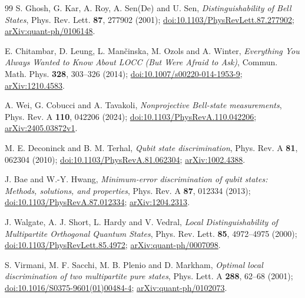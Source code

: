 \documentclass[11pt,a4paper]{article}
\theoremstyle{definition}
\theoremstyle{plain}
\begin{document}
\clearpage
\begingroup\small
\begin{thebibliography}{99}
\setlength{\itemsep}{2pt}
S. Ghosh, G. Kar, A. Roy, A. Sen(De) and U. Sen,
\emph{Distinguishability of Bell States},
Phys. Rev. Lett. \textbf{87}, 277902 (2001);
\href{https://doi.org/10.1103/PhysRevLett.87.277902}{doi:10.1103/PhysRevLett.87.277902};
\href{https://arxiv.org/abs/quant-ph/0106148}{arXiv:quant-ph/0106148}.

E. Chitambar, D. Leung, L. Man\v{c}inska, M. Ozols and A. Winter,
\emph{Everything You Always Wanted to Know About LOCC (But Were Afraid to Ask)},
Commun. Math. Phys. \textbf{328}, 303--326 (2014);
\href{https://doi.org/10.1007/s00220-014-1953-9}{doi:10.1007/s00220-014-1953-9};
\href{https://arxiv.org/abs/1210.4583}{arXiv:1210.4583}.

A. Wei, G. Cobucci and A. Tavakoli,
\emph{Nonprojective Bell-state measurements},
Phys. Rev. A \textbf{110}, 042206 (2024);
\href{https://doi.org/10.1103/PhysRevA.110.042206}{doi:10.1103/PhysRevA.110.042206};
\href{https://arxiv.org/abs/2405.03872v1}{arXiv:2405.03872v1}.

M. E. Deconinck and B. M. Terhal, \emph{Qubit state discrimination},
Phys. Rev. A \textbf{81}, 062304 (2010);
\href{https://doi.org/10.1103/PhysRevA.81.062304}{doi:10.1103/PhysRevA.81.062304};
\href{https://arxiv.org/abs/1002.4388}{arXiv:1002.4388}.

J. Bae and W.-Y. Hwang,
\emph{Minimum-error discrimination of qubit states: Methods, solutions, and properties},
Phys. Rev. A \textbf{87}, 012334 (2013);
\href{https://doi.org/10.1103/PhysRevA.87.012334}{doi:10.1103/PhysRevA.87.012334};
\href{https://arxiv.org/abs/1204.2313}{arXiv:1204.2313}.

J. Walgate, A. J. Short, L. Hardy and V. Vedral,
\emph{Local Distinguishability of Multipartite Orthogonal Quantum States},
Phys. Rev. Lett. \textbf{85}, 4972--4975 (2000);
\href{https://doi.org/10.1103/PhysRevLett.85.4972}{doi:10.1103/PhysRevLett.85.4972};
\href{https://arxiv.org/abs/quant-ph/0007098}{arXiv:quant-ph/0007098}.

S. Virmani, M. F. Sacchi, M. B. Plenio and D. Markham,
\emph{Optimal local discrimination of two multipartite pure states},
Phys. Lett. A \textbf{288}, 62--68 (2001);
\href{https://doi.org/10.1016/S0375-9601(01)00484-4}{doi:10.1016/S0375-9601(01)00484-4};
\href{https://arxiv.org/abs/quant-ph/0102073}{arXiv:quant-ph/0102073}.


\end{thebibliography}
\end{document}
